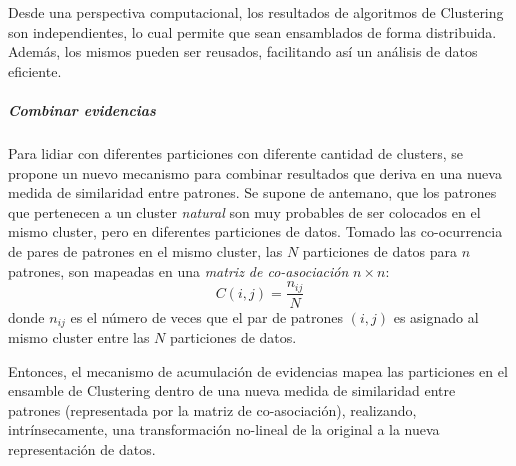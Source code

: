 \bigskip Desde una perspectiva computacional, los resultados de algoritmos de Clustering son independientes, lo cual permite que sean ensamblados de forma distribuida. Además, los mismos pueden ser reusados, facilitando así un análisis de datos eficiente.

\subparagraph{Combinar evidencias}
Para lidiar con diferentes particiones con diferente cantidad de clusters, se propone un nuevo mecanismo para combinar resultados que deriva en una nueva medida de similaridad entre patrones. Se supone de antemano, que los patrones que pertenecen a un cluster \textit{natural} son muy probables de ser colocados en el mismo cluster, pero en diferentes particiones de datos. Tomado las co-ocurrencia de pares de patrones en el mismo cluster, las \(N\) particiones de datos para \(n\) patrones, son mapeadas en una \textit{matriz de co-asociación} \(n \times n\):
\[C(i,j)=\frac{n_{ij}}{N}\]
donde \(n_{ij}\) es el número de veces que el par de patrones \((i,j)\) es asignado al mismo cluster entre las \(N\) particiones de datos.

\bigskip Entonces, el mecanismo de acumulación de evidencias mapea las particiones en el ensamble de Clustering dentro de una nueva medida de similaridad entre patrones (representada por la matriz de co-asociación), realizando, intrínsecamente, una transformación no-lineal de la original a la nueva representación de datos.

